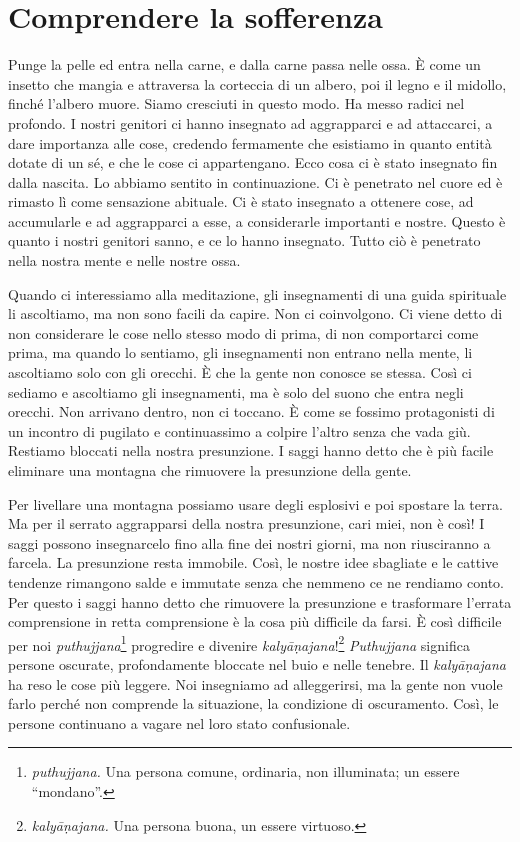 \chapter{Comprendere la sofferenza}

Punge la pelle ed entra nella carne, e dalla carne passa nelle ossa. È
come un insetto che mangia e attraversa la corteccia di un albero, poi
il legno e il midollo, finché l'albero muore. Siamo cresciuti in questo
modo. Ha messo radici nel profondo. I nostri genitori ci hanno insegnato
ad aggrapparci e ad attaccarci, a dare importanza alle cose, credendo
fermamente che esistiamo in quanto entità dotate di un sé, e che le cose
ci appartengano. Ecco cosa ci è stato insegnato fin dalla nascita. Lo
abbiamo sentito in continuazione. Ci è penetrato nel cuore ed è rimasto
lì come sensazione abituale. Ci è stato insegnato a ottenere cose, ad
accumularle e ad aggrapparci a esse, a considerarle importanti e nostre.
Questo è quanto i nostri genitori sanno, e ce lo hanno insegnato. Tutto
ciò è penetrato nella nostra mente e nelle nostre ossa.

Quando ci interessiamo alla meditazione, gli insegnamenti di una guida
spirituale li ascoltiamo, ma non sono facili da capire. Non ci
coinvolgono. Ci viene detto di non considerare le cose nello stesso modo
di prima, di non comportarci come prima, ma quando lo sentiamo, gli
insegnamenti non entrano nella mente, li ascoltiamo solo con gli
orecchi. È che la gente non conosce se stessa. Così ci sediamo e
ascoltiamo gli insegnamenti, ma è solo del suono che entra negli
orecchi. Non arrivano dentro, non ci toccano. È come se fossimo
protagonisti di un incontro di pugilato e continuassimo a colpire
l'altro senza che vada giù. Restiamo bloccati nella nostra presunzione.
I saggi hanno detto che è più facile eliminare una montagna che
rimuovere la presunzione della gente.

Per livellare una montagna possiamo usare degli esplosivi e poi spostare
la terra. Ma per il serrato aggrapparsi della nostra presunzione, cari
miei, non è così! I saggi possono insegnarcelo fino alla fine dei nostri
giorni, ma non riusciranno a farcela. La presunzione resta immobile. Così,
le nostre idee sbagliate e le cattive tendenze rimangono salde e
immutate senza che nemmeno ce ne rendiamo conto. Per questo i saggi
hanno detto che rimuovere la presunzione e trasformare l'errata
comprensione in retta comprensione è la cosa più difficile da farsi. È
così difficile per noi \emph{puthujjana}\footnote{\emph{puthujjana.} Una
  persona comune, ordinaria, non illuminata; un essere ``mondano''.}
progredire e divenire \emph{kalyāṇajana}!\footnote{\emph{kalyāṇajana.}
  Una persona buona, un essere virtuoso.} \emph{Puthujjana} significa
persone oscurate, profondamente bloccate nel buio e nelle tenebre. Il
\emph{kalyāṇajana} ha reso le cose più leggere. Noi insegniamo ad
alleggerirsi, ma la gente non vuole farlo perché non comprende la
situazione, la condizione di oscuramento. Così, le persone continuano a
vagare nel loro stato confusionale.

